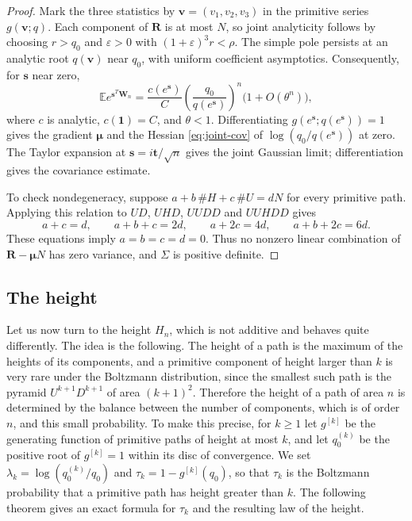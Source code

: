 \documentclass[11pt,reqno]{amsart}
\numberwithin{equation}{section}
\theoremstyle{remark}
\begin{document}
\begin{proof}
Mark the three statistics by $\mathbf v=(v_1,v_2,v_3)$ in the primitive series
$g(\mathbf v;q)$. Each component of $\mathbf R$ is at most $N$, so joint analyticity
follows by choosing $r>q_0$ and $\varepsilon>0$ with
$(1+\varepsilon)^3r<\rho$. The simple pole persists at an analytic root
$q(\mathbf v)$ near $q_0$, with uniform coefficient asymptotics. Consequently,
for $\mathbf s$ near zero,
\[
\mathbb E e^{\mathbf s^T\mathbf W_n}
=\frac{c(e^{\mathbf s})}{C}
\left(\frac{q_0}{q(e^{\mathbf s})}\right)^n
\bigl(1+O(\theta^n)\bigr),
\]
where $c$ is analytic, $c(\mathbf1)=C$, and $\theta<1$. Differentiating
$g(e^{\mathbf s};q(e^{\mathbf s}))=1$ gives the gradient $\boldsymbol\mu$ and
the Hessian \eqref{eq:joint-cov} of $\log(q_0/q(e^{\mathbf s}))$ at zero.
The Taylor expansion at $\mathbf s=i\mathbf t/\sqrt n$ gives the joint Gaussian limit;
differentiation gives the covariance estimate.

To check nondegeneracy, suppose
$a+b\,\#H+c\,\#U=dN$ for every primitive path. Applying this relation to
$UD$, $UHD$, $UUDD$ and $UUHDD$ gives
\[
a+c=d,\qquad a+b+c=2d,\qquad a+2c=4d,\qquad a+b+2c=6d.
\]
These equations imply $a=b=c=d=0$. Thus no nonzero linear combination of
$\mathbf R-\boldsymbol\mu N$ has zero variance, and $\Sigma$ is positive definite.
\end{proof}

\subsection{The height}
Let us now turn to the height $H_n$, which is not additive and behaves quite differently.
The idea is the following. The height of a path is the maximum of the heights of its
components, and a primitive component of height larger than $k$ is very rare under the
Boltzmann distribution, since the smallest such path is the pyramid $U^{k+1}D^{k+1}$ of
area $(k+1)^2$. Therefore the height of a path of area $n$ is determined by the balance
between the number of components, which is of order $n$, and this small probability. To
make this precise, for $k\ge1$ let $g^{[k]}$ be the generating function of primitive
paths of height at most $k$, and let $q^{(k)}_0$ be the positive root of $g^{[k]}=1$
within its disc of convergence. We set $\lambda_k=\log(q^{(k)}_0/q_0)$ and
$\tau_k=1-g^{[k]}(q_0)$, so that $\tau_k$ is the Boltzmann probability that a primitive
path has height greater than $k$. The following theorem gives an exact formula for
$\tau_k$ and the resulting law of the height.
\end{document}

